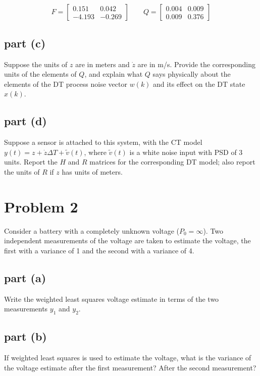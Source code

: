 \documentclass[11pt]{article}
\begin{document}
\subparagraph*{}
\begin{equation*}
	F=\begin{bmatrix} 0.151 & 0.042 \\ -4.193 & -0.269 \end{bmatrix} \qquad Q = \begin{bmatrix} 0.004 & 0.009 \\ 0.009 & 0.376 \end{bmatrix}
\end{equation*}

\subsection*{part (c)}
Suppose the units of $z$ are in meters and $\dot{z}$ are in m/s. Provide the corresponding units of the elements of $Q$, and explain what $Q$ says physically about the elements of the DT process noise vector $w(k)$ and its effect on the DT state $x(k)$.

\subsection*{part (d)}
Suppose a sensor is attached to this system, with the CT model $y(t)=z+\dot{z}\Delta T+\tilde{v}(t)$, where $\tilde{v}(t)$ is a white noise input with PSD of 3 units. Report the $H$ and $R$ matrices for the corresponding DT model; also report the units of $R$ if $z$ has units of meters.

\section*{Problem 2}
Consider a battery with a completely unknown voltage ($P_0=\infty$). Two independent measurements of the voltage are taken to estimate the voltage, the first with a variance of 1 and the second with a variance of 4.

\subsection*{part (a)}
Write the weighted least squares voltage estimate in terms of the two measurements $y_1$ and $y_2$.

\subsection*{part (b)}
If weighted least squares is used to estimate the voltage, what is the variance of the voltage estimate after the first measurement? After the second measurement?
\end{document}
